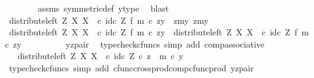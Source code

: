 \begin{isabellebody}
\ \ \ \ \ \ \isamarkupfalse%
\ assms\ symmetric{\isacharunderscore}{\kern0pt}def{}\ y{\isacharunderscore}{\kern0pt}type\ \isamarkupfalse%
\ blast\isanewline
\isanewline
\ \ \ \ \isamarkupfalse%
\ {\isachardoublequoteopen}{\isacharparenleft}{\kern0pt}distribute{\isacharunderscore}{\kern0pt}left\ Z\ X\ X\ \ {\isasymcirc}\isactrlsub c\ {\isacharparenleft}{\kern0pt}id\isactrlsub c\ Z\ {\isasymtimes}\isactrlsub f\ m{\isacharparenright}{\kern0pt}{\isacharparenright}{\kern0pt}\ {\isasymcirc}\isactrlsub c\ zy\ {\isacharequal}{\kern0pt}\ {\isasymlangle}{\isasymlangle}z{\isacharcomma}{\kern0pt}my{}{\isasymrangle}{\isacharcomma}{\kern0pt}\ {\isasymlangle}z{\isacharcomma}{\kern0pt}my{}{\isasymrangle}{\isasymrangle}{\isachardoublequoteclose}\isanewline
\ \ \ \ \isamarkupfalse%
\ {\isacharminus}{\kern0pt}\isanewline
\ \ \ \ \ \ \isamarkupfalse%
\ {\isachardoublequoteopen}{\isacharparenleft}{\kern0pt}distribute{\isacharunderscore}{\kern0pt}left\ Z\ X\ X\ \ {\isasymcirc}\isactrlsub c\ {\isacharparenleft}{\kern0pt}id\isactrlsub c\ Z\ {\isasymtimes}\isactrlsub f\ m{\isacharparenright}{\kern0pt}{\isacharparenright}{\kern0pt}\ {\isasymcirc}\isactrlsub c\ zy\ {\isacharequal}{\kern0pt}\ distribute{\isacharunderscore}{\kern0pt}left\ Z\ X\ X\ \ {\isasymcirc}\isactrlsub c\ {\isacharparenleft}{\kern0pt}id\isactrlsub c\ Z\ {\isasymtimes}\isactrlsub f\ m{\isacharparenright}{\kern0pt}\ {\isasymcirc}\isactrlsub c\ zy{\isachardoublequoteclose}\isanewline
\ \ \ \ \ \ \ \ \isamarkupfalse%
\ yz{\isacharunderscore}{\kern0pt}pair\ \isamarkupfalse%
\ {\isacharparenleft}{\kern0pt}typecheck{\isacharunderscore}{\kern0pt}cfuncs{\isacharcomma}{\kern0pt}\ simp\ add{\isacharcolon}{\kern0pt}\ comp{\isacharunderscore}{\kern0pt}associative{}{\isacharparenright}{\kern0pt}\isanewline
\ \ \ \ \ \ \isamarkupfalse%
\ \isamarkupfalse%
\ {\isachardoublequoteopen}{\isachardot}{\kern0pt}{\isachardot}{\kern0pt}{\isachardot}{\kern0pt}\ {\isacharequal}{\kern0pt}\ distribute{\isacharunderscore}{\kern0pt}left\ Z\ X\ X\ \ {\isasymcirc}\isactrlsub c\ {\isasymlangle}id\isactrlsub c\ Z\ {\isasymcirc}\isactrlsub c\ z\ {\isacharcomma}{\kern0pt}\ m\ {\isasymcirc}\isactrlsub c\ y{\isasymrangle}{\isachardoublequoteclose}\isanewline
\ \ \ \ \ \ \ \ \isamarkupfalse%
\ {\isacharparenleft}{\kern0pt}typecheck{\isacharunderscore}{\kern0pt}cfuncs{\isacharcomma}{\kern0pt}\ simp\ add{\isacharcolon}{\kern0pt}\ cfunc{\isacharunderscore}{\kern0pt}cross{\isacharunderscore}{\kern0pt}prod{\isacharunderscore}{\kern0pt}comp{\isacharunderscore}{\kern0pt}cfunc{\isacharunderscore}{\kern0pt}prod\ yz{\isacharunderscore}{\kern0pt}pair{\isacharparenright}{\kern0pt}\isanewline

\end{isabellebody}
